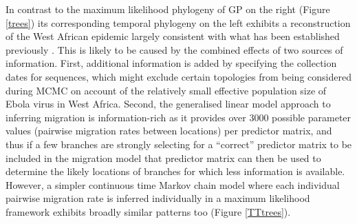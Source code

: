 \documentclass[11pt,oneside,letterpaper]{article}
\begin{document}
In contrast to the maximum likelihood phylogeny of GP on the right (Figure \ref{trees}) its corresponding temporal phylogeny on the left exhibits a reconstruction of the West African epidemic largely consistent with what has been established previously \citep{dudas_virus_2017}.
This is likely to be caused by the combined effects of two sources of information.
First, additional information is added by specifying the collection dates for sequences, which might exclude certain topologies from being considered during MCMC on account of the relatively small effective population size of Ebola virus in West Africa.
Second, the generalised linear model approach to inferring migration is information-rich as it provides over 3000 possible parameter values (pairwise migration rates between locations) per predictor matrix, and thus if a few branches are strongly selecting for a ``correct'' predictor matrix to be included in the migration model that predictor matrix can then be used to determine the likely locations of branches for which less information is available.
However, a simpler continuous time Markov chain model where each individual pairwise migration rate is inferred individually in a maximum likelihood framework exhibits broadly similar patterns too (Figure \ref{TTtrees}).
\end{document}
